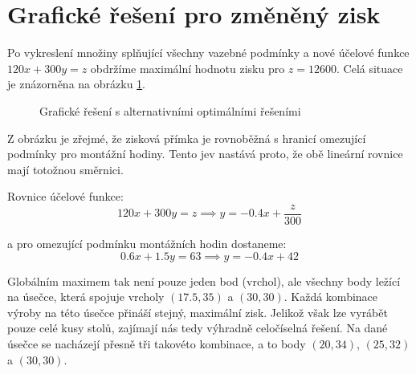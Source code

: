 \documentclass[../sablona-main.tex]{subfiles}
\begin{document}
	\section{Grafické řešení pro změněný zisk}
	Po vykreslení množiny splňující všechny vazebné podmínky a nové účelové funkce $120x + 300y = z$ obdržíme maximální hodnotu zisku pro $z = 12600$. Celá situace je znázorněna na obrázku \ref{fig: Graficke reseni alternativni}.
	
	\begin{figure}[H]
		\centering
		
		\caption{Grafické řešení s alternativními optimálními řešeními} \label{fig: Graficke reseni alternativni}
	\end{figure}
	
	Z obrázku je zřejmé, že zisková přímka je rovnoběžná s hranicí omezující podmínky pro montážní hodiny. Tento jev nastává proto, že obě lineární rovnice mají totožnou směrnici. 
	
	Rovnice účelové funkce:
	$$120x + 300y = z \implies y = -0.4x + \frac{z}{300}$$
	
	a pro omezující podmínku montážních hodin dostaneme:
	$$0.6x + 1.5y = 63 \implies y = -0.4x + 42$$
	
	Globálním maximem tak není pouze jeden bod (vrchol), ale všechny body ležící na úsečce, která spojuje vrcholy $(17.5, 35)$ a $(30, 30)$. Každá kombinace výroby na této úsečce přináší stejný, maximální zisk. Jelikož však lze vyrábět pouze celé kusy stolů, zajímají nás tedy výhradně celočíselná řešení. Na dané úsečce se nacházejí přesně tři takovéto kombinace, a to body $(20, 34)$, $(25, 32)$ a $(30, 30)$.
\end{document}
